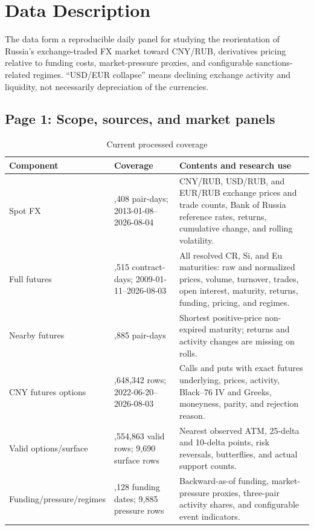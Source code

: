 \section*{Data Description}

The data form a reproducible daily panel for studying the reorientation of
Russia's exchange-traded FX market toward CNY/RUB, derivatives pricing relative
to funding costs, market-pressure proxies, and configurable sanctions-related
regimes. ``USD/EUR collapse'' means declining exchange activity and liquidity,
not necessarily depreciation of the currencies.

\subsection*{Page 1: Scope, sources, and market panels}

\begin{table}[ht]
\small
\caption{Current processed coverage}
\begin{tabularx}{\textwidth}{>{\raggedright\arraybackslash}p{3.0cm} >{\raggedright\arraybackslash}p{3.3cm} X}
\toprule
Component & Coverage & Contents and research use \\
\midrule
Spot FX & 12,408 pair-days; 2013-01-08--2026-08-04 & CNY/RUB, USD/RUB, and EUR/RUB exchange prices and trade counts, Bank of Russia reference rates, returns, cumulative change, and rolling volatility. \\
Full futures & 56,515 contract-days; 2009-01-11--2026-08-03 & All resolved CR, Si, and Eu maturities: raw and normalized prices, volume, turnover, trades, open interest, maturity, returns, funding, pricing, and regimes. \\
Nearby futures & 9,885 pair-days & Shortest positive-price non-expired maturity; returns and activity changes are missing on rolls. \\
CNY futures options & 1,648,342 rows; 2022-06-20--2026-08-03 & Calls and puts with exact futures underlying, prices, activity, Black--76 IV and Greeks, moneyness, parity, and rejection reason. \\
Valid options/surface & 1,554,863 valid rows; 9,690 surface rows & Nearest observed ATM, 25-delta and 10-delta points, risk reversals, butterflies, and actual support counts. \\
Funding/pressure/regimes & 5,128 funding dates; 9,885 pressure rows & Backward-as-of funding, market-pressure proxies, three-pair activity shares, and configurable event indicators. \\
\bottomrule
\end{tabularx}
\end{table}

